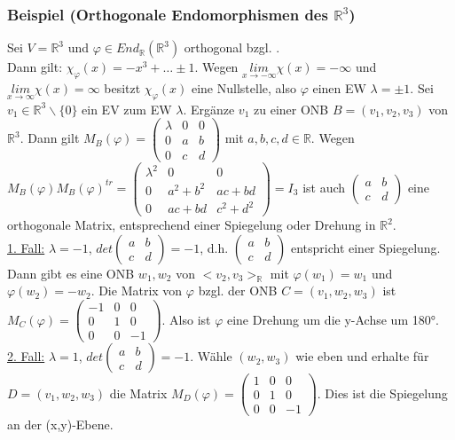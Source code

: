 \documentclass[a4paper]{article}
\newcommand{\ul}{\underline}
\let\phi\varphi
\begin{document}
\subsubsection{Beispiel (Orthogonale Endomorphismen des \(\mathbb{R}^3\))}
Sei \(V=\mathbb{R}^3\) und \(\phi\in End_\mathbb{R}(\mathbb{R}^3)\) orthogonal bzgl. \(<,>\).\\
Dann gilt: \(\chi_\phi(x)=-x^3+\dots\pm 1\). Wegen \(\underset{x\rightarrow-\infty}{lim}\chi(x)=-\infty\) und \(\underset{x\rightarrow\infty}{lim}\chi(x)=\infty\) besitzt \(\chi_\phi(x)\) eine Nullstelle, also \(\phi\) einen EW \(\lambda=\pm 1\). Sei \(v_1\in\mathbb{R}^3\backslash\{0\}\) ein EV zum EW \(\lambda\). Ergänze \(v_1\) zu einer ONB \(B=(v_1,v_2,v_3)\) von \(\mathbb{R}^3\). Dann gilt \(M_B(\phi)=\begin{pmatrix}
\lambda& 0 & 0\\
0 & a & b\\
0 & c & d
\end{pmatrix}\) mit \(a,b,c,d\in\mathbb{R}\). Wegen \(M_B(\phi)M_B(\phi)^{tr}=\begin{pmatrix}
\lambda^2 & 0 & 0\\
0 & a^2+b^2 & ac+bd\\
0 & ac+bd & c^2+d^2
\end{pmatrix}=I_3\) ist auch \(\begin{pmatrix}
a & b\\
c & d
\end{pmatrix}\) eine orthogonale Matrix, entsprechend einer Spiegelung oder Drehung in \(\mathbb{R}^2\).\\
\ul{1. Fall:} \(\lambda=-1\), \(det\begin{pmatrix}
a & b\\
c & d
\end{pmatrix}=-1\), d.h. \(\begin{pmatrix}
a & b\\
c & d
\end{pmatrix}\) entspricht einer Spiegelung. Dann gibt es eine ONB \(w_1,w_2\) von \(<v_2,v_3>_\mathbb{R}\) mit \(\phi(w_1)=w_1\) und \(\phi(w_2)=-w_2\).
Die Matrix von \(\phi\) bzgl. der ONB \(C=(v_1,w_2,w_3)\) ist \(M_C(\phi)=\begin{pmatrix}
-1 & 0 & 0\\
0 & 1 & 0\\
0 & 0 & -1
\end{pmatrix}\). Also ist \(\phi\) eine Drehung um die y-Achse um 180°.\\
\ul{2. Fall:} \(\lambda=1\), \(det\begin{pmatrix}
a & b\\
c & d
\end{pmatrix}=-1\). Wähle \((w_2,w_3)\) wie eben und erhalte für \(D=(v_1,w_2,w_3)\) die Matrix \(M_D(\phi)=\begin{pmatrix}
1 & 0 & 0\\
0 & 1 & 0\\
0 & 0 & -1
\end{pmatrix}\). Dies ist die Spiegelung an der (x,y)-Ebene.\\
\end{document}
